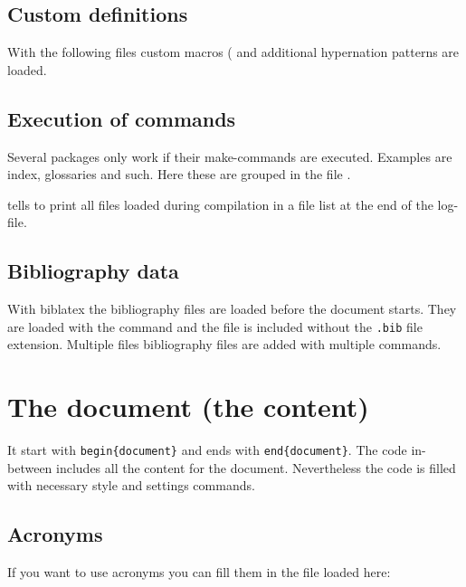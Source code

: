 \subsection{Custom definitions}
With the following files custom macros ( and additional hypernation patterns  are loaded. 

\subsection{Execution of commands}
\label{sec:ExecutionOfCommands}
Several packages only work if their make-commands are executed. Examples are index, glossaries and such. Here these are grouped in the file . 

 tells \latex to print all files loaded during compilation in a file list at the end of the log-file.
%

\subsection{Bibliography data}
With biblatex the bibliography files are loaded before the document starts. 
They are loaded with the command  and the file is included without the \texttt{.bib} file extension. Multiple files bibliography files are added with multiple  commands.

\section{The document (the content)}
\label{sec:main:document}
It start with \texttt{\bs{}begin\{document\}} and ends with \texttt{\bs{}end\{document\}}.
The code in-between includes all the content for the document. Nevertheless the code is filled with necessary style and settings commands.

\subsection{Acronyms}
If you want to use acronyms you can fill them in the file loaded here:
%
